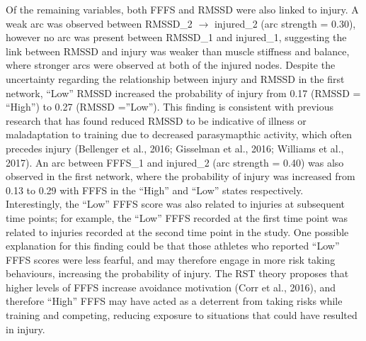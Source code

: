 \documentclass[man,floatsintext]{apa6}
\begin{document}
Of the remaining variables, both FFFS and RMSSD were also linked to injury.
A weak arc was observed between RMSSD\_2 \(\rightarrow\) injured\_2 (arc strength = 0.30), however no arc was present between RMSSD\_1 and injured\_1, suggesting the link between RMSSD and injury was weaker than muscle stiffness and balance, where stronger arcs were observed at both of the injured nodes.
Despite the uncertainty regarding the relationship between injury and RMSSD in the first network, \enquote{Low} RMSSD increased the probability of injury from 0.17 (RMSSD = \enquote{High'') to 0.27 (RMSSD =}Low'').
This finding is consistent with previous research that has found reduced RMSSD to be indicative of illness or maladaptation to training due to decreased parasymapthic activity, which often precedes injury (Bellenger et al., 2016; Gisselman et al., 2016; Williams et al., 2017).
An arc between FFFS\_1 and injured\_2 (arc strength = 0.40) was also observed in the first network, where the probability of injury was increased from 0.13 to 0.29 with FFFS in the \enquote{High} and \enquote{Low} states respectively.
Interestingly, the \enquote{Low} FFFS score was also related to injuries at subsequent time points; for example, the \enquote{Low} FFFS recorded at the first time point was related to injuries recorded at the second time point in the study.
One possible explanation for this finding could be that those athletes who reported \enquote{Low} FFFS scores were less fearful, and may therefore engage in more risk taking behaviours, increasing the probability of injury.
The RST theory proposes that higher levels of FFFS increase avoidance motivation (Corr et al., 2016), and therefore \enquote{High} FFFS may have acted as a deterrent from taking risks while training and competing, reducing exposure to situations that could have resulted in injury.
\end{document}
